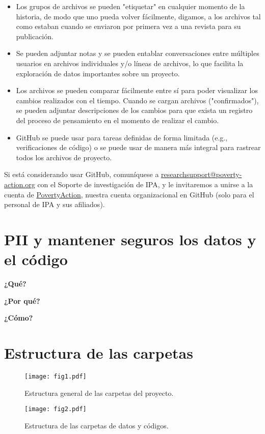 \documentclass[11pt,en]{elegantpaper}
\begin{document}
\begin{itemize}
	\item Los grupos de archivos se pueden "etiquetar" en cualquier momento de la historia, de modo que uno pueda volver fácilmente, digamos, a los archivos tal como estaban cuando se enviaron por primera vez a una revista para su publicación.
	
	\item Se pueden adjuntar notas y se pueden entablar conversaciones entre múltiples usuarios en archivos individuales y/o líneas de archivos, lo que facilita la exploración de datos importantes sobre un proyecto.
	
	\item Los archivos se pueden comparar fácilmente entre sí para poder visualizar los cambios realizados con el tiempo. Cuando se cargan archivos ("confirmados"), se pueden adjuntar descripciones de los cambios para que exista un registro del proceso de pensamiento en el momento de realizar el cambio.
	
	\item GitHub se puede usar para tareas definidas de forma limitada (e.g., verificaciones de código) o se puede usar de manera más integral para rastrear todos los archivos de proyecto.
\end{itemize}

Si está considerando usar GitHub, comuníquese a \href{mailto:researchsupport@poverty-action.org}{researchsupport@poverty-action.org} con el Soporte de investigación de IPA, y le invitaremos a unirse a la cuenta de \href{https://github.com/PovertyAction}{PovertyAction}, nuestra cuenta organizacional en GitHub (solo para el personal de IPA y sus afiliados).

\newpage 
\section{PII y mantener seguros los datos y el código}
\label{sec:pii}

\textbf{¿Qué?}


\textbf{¿Por qué?}


\textbf{¿Cómo?} 

\newpage 
\appendix 
\section{Estructura de las carpetas}
\label{sec:appendix}
\begin{figure}[htbp]
	\centering
	\caption{Estructura general de las carpetas del proyecto.\label{fig:carpetas}}
	\texttt{[image: fig1.pdf]}
\end{figure}


\begin{figure}[htbp]
	\centering
	\caption{Estructura de las carpetas de datos y códigos. \label{fig:code}}
	\texttt{[image: fig2.pdf]}
\end{figure}

\end{document}
